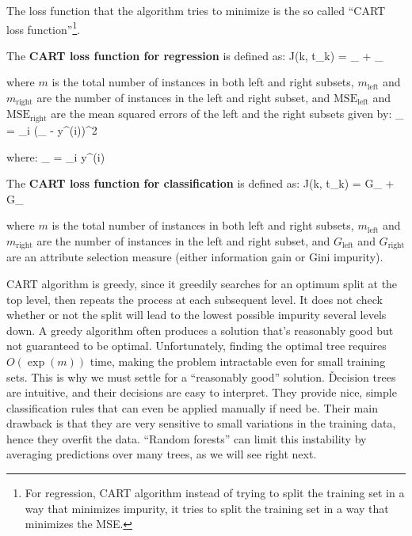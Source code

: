 The loss function that the algorithm tries to minimize is the so called ``CART loss function''\footnote{For regression,
CART algorithm instead of trying to split the training set in a way that minimizes impurity, it tries to split the
training set in a way that minimizes the MSE\@.}.

The \textbf{CART loss function for regression} is defined as:
\bse
J(k, t_{k}) =  _{} + _{}
\ese

where $m$ is the total number of instances in both left and right subsets, $m_{\text{left}}$ and $m_{\text{right}}$ are
the number of instances in the left and right subset, and $\text{MSE}_{\text{left}}$ and $\text{MSE}_{\text{right}}$ are
the mean squared errors of the left and the right subsets given by:
\bse
{}_{} = \sum_{i \in {}} ({}_ - y^{(i)})^2
\ese

where:
\bse
{}_ =  \sum_{i \in {}} y^{(i)}
\ese

The \textbf{CART loss function for classification} is defined as:
\bse
J(k, t_{k}) =  G_{} +  G_{}
\ese

where $m$ is the total number of instances in both left and right subsets, $m_{\text{left}}$ and $m_{\text{right}}$ are
the number of instances in the left and right subset, and $G_{\text{left}}$ and $G_{\text{right}}$ are an attribute
selection measure (either information gain or Gini impurity).
\ed

CART algorithm is greedy, since it greedily searches for an optimum split at the top level, then repeats the process
at each subsequent level. It does not check whether or not the split will lead to the lowest possible impurity
several levels down. A greedy algorithm often produces a solution that's reasonably good but not guaranteed to be
optimal. Unfortunately, finding the optimal tree requires $O(\exp(m))$ time, making the problem intractable even for
small training sets. This is why we must settle for a ``reasonably good'' solution. \v

Decision trees are intuitive, and their decisions are easy to interpret. They provide nice, simple classification
rules that can even be applied manually if need be. Their main drawback is that they are very sensitive to small
variations in the training data, hence they overfit the data. ``Random forests'' can limit this instability by
averaging predictions over many trees, as we will see right next.

